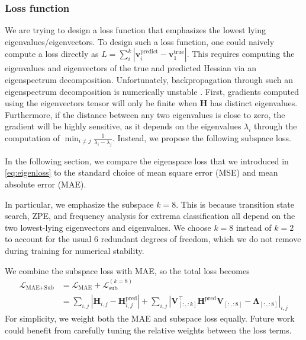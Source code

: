 \documentclass[pdflatex,sn-mathphys-num]{sn-jnl}%
\theoremstyle{thmstyleone}%
\theoremstyle{thmstyletwo}%
\theoremstyle{thmstylethree}%
\begin{document}
\begin{appendices}
\subsubsection{Loss function\label{sec:lossablation}}
We are trying to design a loss function that emphasizes the lowest lying eigenvalues/eigenvectors.
To design such a loss function, one could naively compute a loss directly as $L= \sum_i^k |\mathbf{v}_i^\text{predict} - \mathbf{v}_1^\text{true}|$. This requires computing the eigenvalues and eigenvectors of the true and predicted Hessian via an eigenspectrum decomposition. Unfortunately, backpropagation through such an eigenspectrum decomposition is numerically unstable \citep{aaComputationEigenvalueEigenvector2007}.
First, gradients computed using the eigenvectors tensor will only be finite when $\mathbf{H}$ has distinct eigenvalues. Furthermore, if the distance between any two eigenvalues is close to zero, the gradient will be highly sensitive, as it depends on the eigenvalues $\lambda_i $ through the computation of
$
\min_{i \neq j} \frac{1}{\lambda_i - \lambda_j}
$.
Instead, we propose the following subspace loss.

In the following section, we compare the eigenspace loss that we introduced in \eqref{eq:eigenloss} to the standard choice of mean square error (MSE) and mean absolute error (MAE). 

In particular, we emphasize the subspace $k=8$. This is because transition state search, ZPE, and frequency analysis for extrema classification all depend on the two lowest-lying eigenvectors and eigenvalues. We choose $k=8$ instead of $k=2$ to account for the usual $6$ redundant degrees of freedom, which we do not remove during training for numerical stability.

We combine the subspace loss with MAE, so the total loss becomes
\begin{align}
    \mathcal{L}_\text{MAE+Sub} 
    &= \mathcal{L}_\text{MAE} + \mathcal{L}_\text{sub}^{(k=8)} \\
    &=
    \sum_{i,j} |\mathbf{H}_{i,j} - \mathbf{H}^\text{pred}_{i,j}|
     + \sum_{i,j} \left|\mathbf{V}_{[:,:k]}^\top \mathbf{H}^\text{pred}\mathbf{V}_{[:,:8]} - \mathbf{\Lambda}_{[:,:8]}\right|_{i,j} 
\end{align}
For simplicity, we weight both the MAE and subspace loss equally. Future work could benefit from carefully tuning the relative weights between the loss terms.


\end{appendices}
\end{document}
